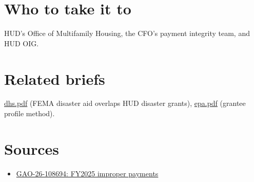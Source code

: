 \documentclass[letterpaper,11pt]{article}
\providecommand{\tightlist}{\setlength{\itemsep}{0pt}\setlength{\parskip}{0pt}}
\begin{document}
\hypertarget{who-to-take-it-to}{%
\section{Who to take it to}\label{who-to-take-it-to}}

HUD's Office of Multifamily Housing, the CFO's payment integrity team,
and HUD OIG.

\hypertarget{related-briefs}{%
\section{Related briefs}\label{related-briefs}}

\url{dhs.pdf} (FEMA disaster aid overlaps HUD disaster grants),
\url{epa.pdf} (grantee profile method).

\hypertarget{sources}{%
\section{Sources}\label{sources}}

\begin{itemize}
\tightlist
\item
  \href{https://www.gao.gov/products/gao-26-108694}{GAO-26-108694:
  FY2025 improper payments}
\end{itemize}
\end{document}
